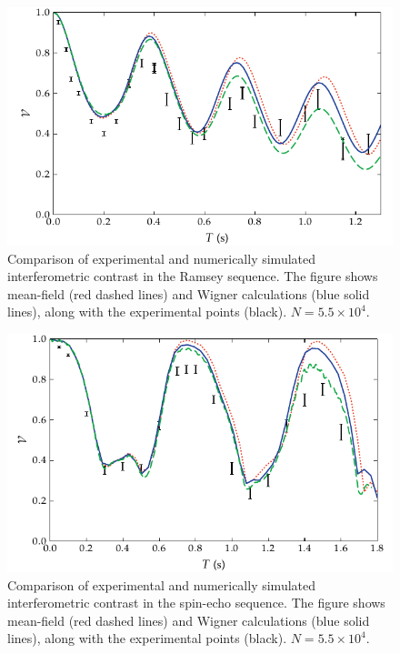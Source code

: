 \begin{figure}
    \centerline{\includegraphics{figures_generated/phase_noise/ramsey_visibility_short.pdf}}

    \caption{
    Comparison of experimental and numerically simulated interferometric contrast in the Ramsey sequence.
    The figure shows mean-field (red dashed lines) and Wigner calculations (blue solid lines), along with the experimental points (black).
    $N = 5.5 \times 10^4$.}

    \label{fig:bec-noise:phase-noise:ramsey-visibility}
\end{figure}

\begin{figure}
    \centerline{\includegraphics{figures_generated/phase_noise/echo_visibility_short.pdf}}

    \caption{
    Comparison of experimental and numerically simulated interferometric contrast in the spin-echo sequence.
    The figure shows mean-field (red dashed lines) and Wigner calculations (blue solid lines), along with the experimental points (black).
    $N = 5.5 \times 10^4$.}

    \label{fig:bec-noise:phase-noise:echo-visibility}
\end{figure}

